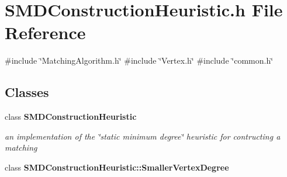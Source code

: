 \section{S\+M\+D\+Construction\+Heuristic.\+h File Reference}
\label{SMDConstructionHeuristic_8h}
{\ttfamily \#include \char`\"{}Matching\+Algorithm.\+h\char`\"{}}\newline
{\ttfamily \#include \char`\"{}Vertex.\+h\char`\"{}}\newline
{\ttfamily \#include \char`\"{}common.\+h\char`\"{}}\newline
\subsection*{Classes}
\begin{DoxyCompactItemize}
\item 
class \textbf{ S\+M\+D\+Construction\+Heuristic}
\begin{DoxyCompactList}\small\item\em an implementation of the \char`\"{}static minimum degree\char`\"{} heuristic for contructing a matching \end{DoxyCompactList}\item 
class \textbf{ S\+M\+D\+Construction\+Heuristic\+::\+Smaller\+Vertex\+Degree}
\end{DoxyCompactItemize}
